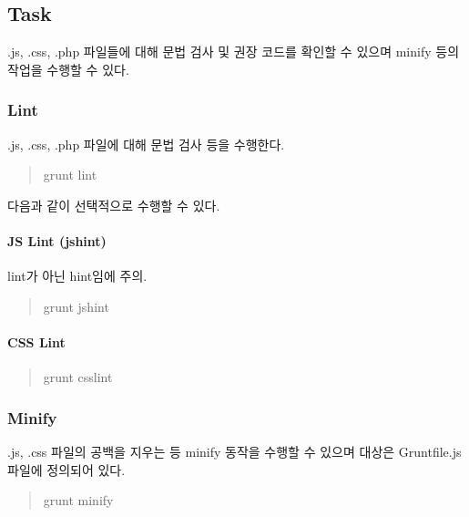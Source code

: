 \subsection*{Task}

.js, .css, .php 파일들에 대해 문법 검사 및 권장 코드를 확인할 수 있으며 minify 등의 작업을 수행할 수 있다.

\subsubsection*{Lint}

.js, .css, .php 파일에 대해 문법 검사 등을 수행한다. \begin{quote}
grunt lint \end{quote}


다음과 같이 선택적으로 수행할 수 있다.

\paragraph*{J\+S Lint (jshint)}

{\ttfamily lint}가 아닌 {\ttfamily hint}임에 주의. \begin{quote}
grunt jshint \end{quote}


\paragraph*{C\+S\+S Lint}

\begin{quote}
grunt csslint \end{quote}


\subsubsection*{Minify}

.js, .css 파일의 공백을 지우는 등 minify 동작을 수행할 수 있으며 대상은 Gruntfile.\+js 파일에 정의되어 있다.

\begin{quote}
grunt minify\end{quote}
